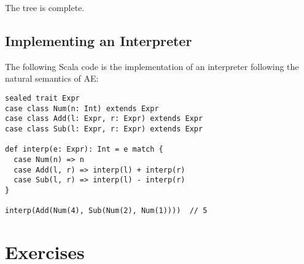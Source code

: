 The tree is complete.

\subsection{Implementing an Interpreter}

The following Scala code is the implementation of an interpreter following the
natural semantics of AE:

\begin{verbatim}
sealed trait Expr
case class Num(n: Int) extends Expr
case class Add(l: Expr, r: Expr) extends Expr
case class Sub(l: Expr, r: Expr) extends Expr

def interp(e: Expr): Int = e match {
  case Num(n) => n
  case Add(l, r) => interp(l) + interp(r)
  case Sub(l, r) => interp(l) - interp(r)
}

interp(Add(Num(4), Sub(Num(2), Num(1))))  // 5
\end{verbatim}

\section{Exercises}
